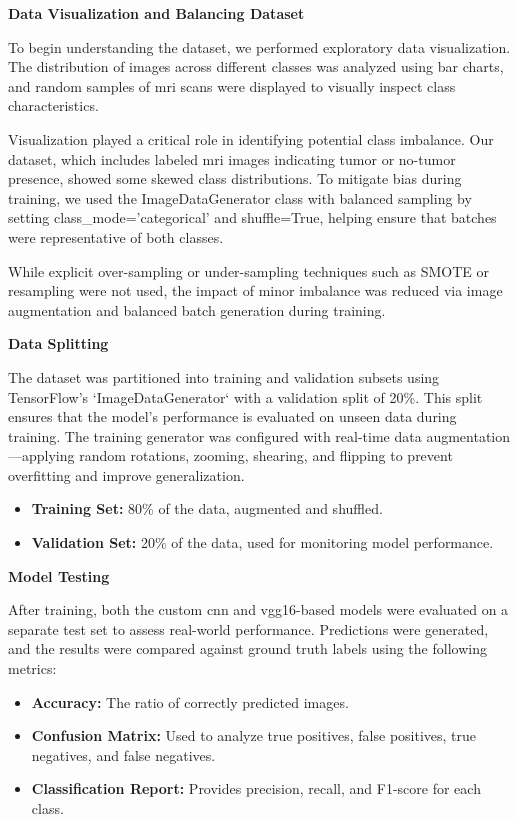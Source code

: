 \textbf{Data Visualization and Balancing Dataset}

To begin understanding the dataset, we performed exploratory data visualization. The distribution of images across different classes was analyzed using bar charts, and random samples of \gls{mri} scans were displayed to visually inspect class characteristics.

Visualization played a critical role in identifying potential class imbalance. Our dataset, which includes labeled \gls{mri} images indicating tumor or no-tumor presence, showed some skewed class distributions. To mitigate bias during training, we used the ImageDataGenerator class with balanced sampling by setting class\_mode='categorical' and shuffle=True, helping ensure that batches were representative of both classes.

While explicit over-sampling or under-sampling techniques such as SMOTE or resampling were not used, the impact of minor imbalance was reduced via image augmentation and balanced batch generation during training.

\textbf{Data Splitting}

The dataset was partitioned into training and validation subsets using TensorFlow’s `ImageDataGenerator` with a validation split of 20\%. This split ensures that the model's performance is evaluated on unseen data during training. The training generator was configured with real-time data augmentation—applying random rotations, zooming, shearing, and flipping to prevent overfitting and improve generalization.

\begin{itemize}
    \item \textbf{Training Set:} 80\% of the data, augmented and shuffled.
    \item \textbf{Validation Set:} 20\% of the data, used for monitoring model performance.
\end{itemize}

\textbf{Model Testing}

After training, both the custom \gls{cnn} and \gls{vgg16}-based models were evaluated on a separate test set to assess real-world performance. Predictions were generated, and the results were compared against ground truth labels using the following metrics:

\begin{itemize}
    \item \textbf{Accuracy:} The ratio of correctly predicted images.
    \item \textbf{Confusion Matrix:} Used to analyze true positives, false positives, true negatives, and false negatives.
    \item \textbf{Classification Report:} Provides precision, recall, and F1-score for each class.
\end{itemize}

